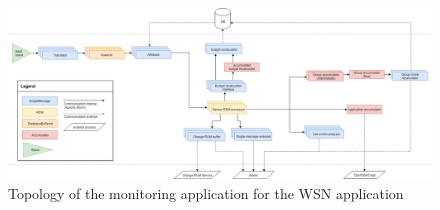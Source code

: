 \begin{figure}
\centering
\includegraphics[width=1.15\textwidth]{resources/img/sensit_topology.png}
\caption{Topology of the monitoring application for the \idsystems \sensit WSN application}
\label{fig:sensit_topology}
\end{figure}

